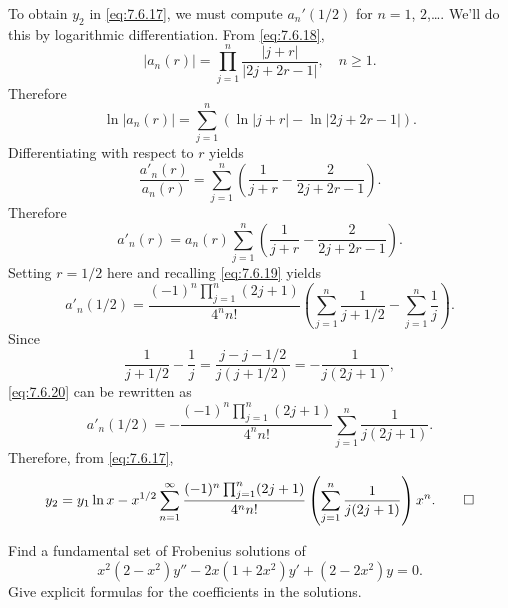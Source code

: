 \begin{solution}
To obtain $y_2$ in \eqref{eq:7.6.17}, we must compute $a_n'(1/2)$
for $n=1$, $2$,\dots. We'll do this by logarithmic
differentiation.  From \eqref{eq:7.6.18},
\[
|a_n(r)|=\prod_{j=1}^n\frac{|j+r|}{|2j+2r-1|},\quad n\ge1.
\]
Therefore
\[
\ln |a_n(r)|=\sum^n_{j=1} \left(\ln |j+r|-\ln|2j+2r-1|\right).
\]
Differentiating with respect to $r$ yields
\[
\frac{a'_n(r)}{a_n(r)}=\sum^n_{j=1} \left(\frac{1}{j+r}-\frac{2}{2j+2r-1}\right).
\]
Therefore
\[
a'_n(r)=a_n(r) \sum^n_{j=1} \left(\frac{1}{j+r}-\frac{2}{2j+2r-1}\right).
\]
Setting $r=1/2$ here and recalling \eqref{eq:7.6.19} yields
\begin{equation} \label{eq:7.6.20}
a'_n(1/2)=\frac{(-1)^n\prod_{j=1}^n(2j+1)}{4^nn!}\left(\sum_{j=1}^n\frac{1}{j+1/2}-\sum_{j=1}^n\frac{1}{j}\right).
\end{equation}
Since
\[
\frac{1}{j+1/2}-\frac{1}{j}=\frac{j-j-1/2}{j(j+1/2)}=-\frac{1}{j(2j+1)},
\]
 \eqref{eq:7.6.20} can be rewritten as
\[
a'_n(1/2)=-\frac{(-1)^n\prod_{j=1}^n(2j+1)}{4^nn!}
\sum_{j=1}^n\frac{1}{j(2j+1)}.
\]
Therefore, from \eqref{eq:7.6.17},
\[
y_2=y_1\ln
x-x^{1/2}\sum_{n=1}^\infty\frac{(-1)^n\prod_{j=1}^n(2j+1)}{4^nn!}
\left(\sum_{j=1}^n\frac{1}{j(2j+1)}\right)x^n.\qedhere
\]
\end{solution}

\begin{example}\label{example:7.6.3}
Find a fundamental set of Frobenius  solutions of
\begin{equation} \label{eq:7.6.21}
x^2(2-x^2)y''-2x(1+2x^2)y'+(2-2x^2)y=0.
\end{equation}
Give explicit formulas for the coefficients in the solutions.
\end{example}

